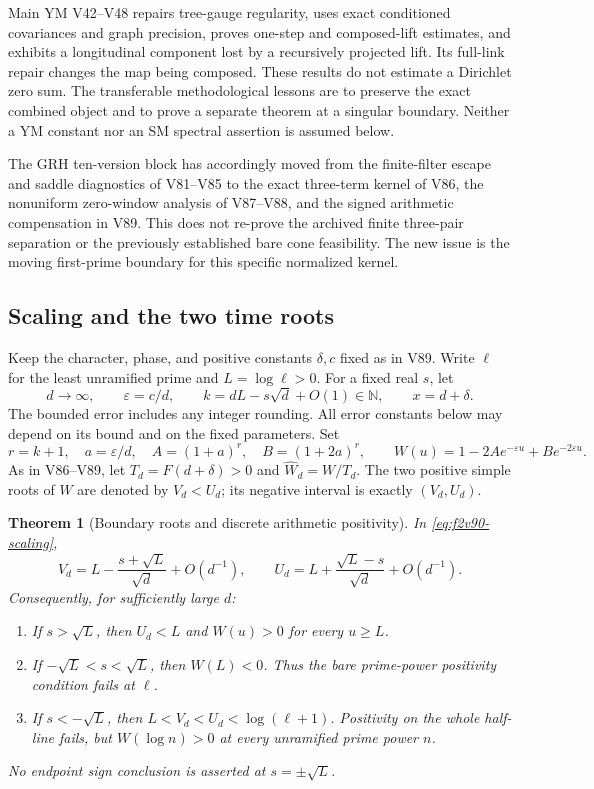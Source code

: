 \documentclass[11pt]{article}
\newtheorem{theorem}{Theorem}[section]
\theoremstyle{definition}
\theoremstyle{remark}
\begin{document}
Main YM V42--V48 repairs tree-gauge regularity, uses exact conditioned
covariances and graph precision, proves one-step and composed-lift
estimates, and exhibits a longitudinal component lost by a recursively
projected lift.  Its full-link repair changes the map being composed.
These results do not estimate a Dirichlet zero sum.  The transferable
methodological lessons are to preserve the exact combined object and
to prove a separate theorem at a singular boundary.  Neither a YM
constant nor an SM spectral assertion is assumed below.

The GRH ten-version block has accordingly moved from the finite-filter
escape and saddle diagnostics of V81--V85 to the exact three-term
kernel of V86, the nonuniform zero-window analysis of V87--V88, and
the signed arithmetic compensation in V89.  This does not re-prove
the archived finite three-pair separation or the previously established
bare cone feasibility.  The new issue is the moving first-prime
boundary for this specific normalized kernel.

\subsection{Scaling and the two time roots}

Keep the character, phase, and positive constants \(\delta,c\) fixed
as in V89.  Write \(\ell\) for the least unramified prime and
\(L=\log\ell>0\).  For a fixed real \(s\), let
\begin{equation}
 d\to\infty,\qquad \varepsilon=c/d,\qquad
 k=dL-s\sqrt d+O(1)\in\mathbb N,\qquad x=d+\delta.
 \label{eq:f2v90-scaling}
\end{equation}
The bounded error includes any integer rounding.  All error constants
below may depend on its bound and on the fixed parameters.  Set
\[
 r=k+1,\quad a=\varepsilon/d,\quad
 A=(1+a)^r,\quad B=(1+2a)^r,\qquad
 W(u)=1-2Ae^{-\varepsilon u}+Be^{-2\varepsilon u}.
\]
As in V86--V89, let \(T_d=F(d+\delta)>0\) and
\(\widehat W_d=W/T_d\).  The two positive simple roots of \(W\)
are denoted by \(V_d<U_d\); its negative interval is exactly
\((V_d,U_d)\).

\begin{theorem}[Boundary roots and discrete arithmetic positivity]
\label{thm:f2v90-roots}
In \eqref{eq:f2v90-scaling},
\begin{equation}
 V_d=L-\frac{s+\sqrt L}{\sqrt d}+O(d^{-1}),\qquad
 U_d=L+\frac{\sqrt L-s}{\sqrt d}+O(d^{-1}).
 \label{eq:f2v90-roots}
\end{equation}
Consequently, for sufficiently large \(d\):
\begin{enumerate}
\item If \(s>\sqrt L\), then \(U_d<L\) and \(W(u)>0\) for
every \(u\ge L\).
\item If \(-\sqrt L<s<\sqrt L\), then \(W(L)<0\).  Thus
the bare prime-power positivity condition fails at \(\ell\).
\item If \(s<-\sqrt L\), then
\(L<V_d<U_d<\log(\ell+1)\).  Positivity on the whole half-line
fails, but \(W(\log n)>0\) at every unramified prime power \(n\).
\end{enumerate}
No endpoint sign conclusion is asserted at \(s=\pm\sqrt L\).
\end{theorem}
\end{document}
